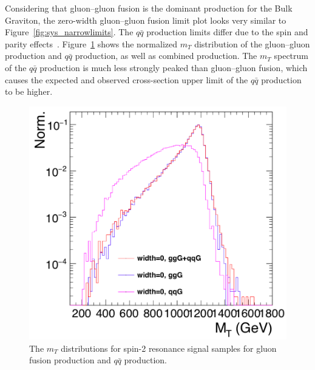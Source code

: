 \vspace{0.3cm}
Considering that gluon–gluon fusion is the dominant production for the Bulk Graviton, the zero-width gluon–gluon fusion limit plot looks very similar to Figure~\ref{fig:sys_narrowlimits}. The $q\bar{q}$ production limits differ due to the spin and parity effects~\cite{sys_resoproduction}. Figure~\ref{fig:sys_ggqqdiff} shows the normalized $m_T$ distribution of the gluon–gluon production and $q\bar{q}$ production, as well as combined production. The $m_T$ spectrum of the $q\bar{q}$ production is much less strongly peaked than gluon–gluon fusion, which causes the expected and observed cross-section upper limit of the $q\bar{q}$ production to be higher.
\begin{figure}[htbp]
\begin{center}
\includegraphics[width=0.9\linewidth]{figures/sys_ggqqdiff.png}
\caption{The $m_T$ distributions for spin-2 resonance signal samples for gluon fusion production and $q\bar{q}$ production.}
\label{fig:sys_ggqqdiff}
\end{center}
\end{figure}
